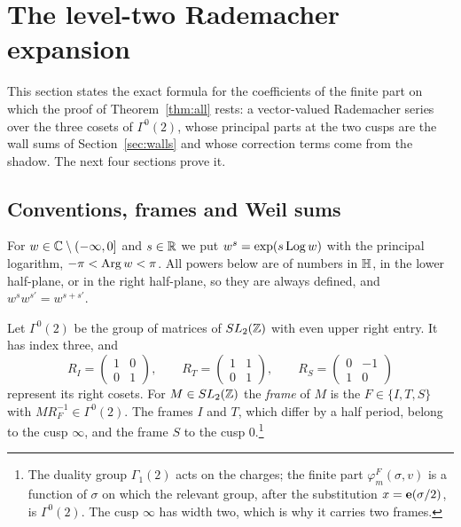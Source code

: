 \section{The level-two Rademacher expansion}\label{sec:rademacher}

This section states the exact formula for the coefficients of the finite part on which the proof of Theorem~\ref{thm:all} rests: a vector-valued Rademacher series over the three cosets of $\Gamma^0(2)$, whose principal parts at the two cusps are the wall sums of Section~\ref{sec:walls} and whose correction terms come from the shadow. The next four sections prove it.

\subsection{Conventions, frames and Weil sums}\label{circ:conv}
For $w\in\mathbb{C}\setminus(-\infty,0]$ and $s\in\mathbb{R}$ we put $w^s=\exp(s\operatorname{Log} w)$ with the principal logarithm, $-\pi<\operatorname{Arg} w<\pi$. All powers below are of numbers in $\mathbb{H}$, in the lower half-plane, or in the right half-plane, so they are always defined, and $w^sw^{s'}=w^{s+s'}$.

Let $\Gamma^0(2)$ be the group of matrices of $SL_2(\mathbb{Z})$ with even upper right entry. It has index three, and
\[
R_I=\begin{pmatrix}1&0\\0&1\end{pmatrix},\qquad R_T=\begin{pmatrix}1&1\\0&1\end{pmatrix},\qquad R_S=\begin{pmatrix}0&-1\\1&0\end{pmatrix}
\]
represent its right cosets. For $M\in SL_2(\mathbb{Z})$ the \emph{frame} of $M$ is the $F\in\{I,T,S\}$ with $MR_F^{-1}\in\Gamma^0(2)$. The frames $I$ and $T$, which differ by a half period, belong to the cusp $\infty$, and the frame $S$ to the cusp $0$.\footnote{The duality group $\Gamma_1(2)$ acts on the charges; the finite part $\varphi^F_m(\sigma,v)$ is a function of $\sigma$ on which the relevant group, after the substitution $x=\mathbf e(\sigma/2)$, is $\Gamma^0(2)$. The cusp $\infty$ has width two, which is why it carries two frames.}

